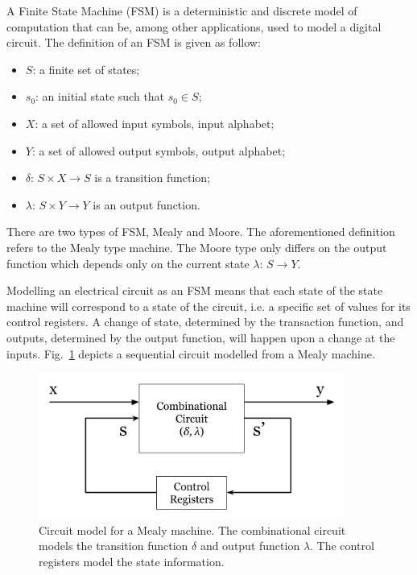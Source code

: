 A Finite State Machine (FSM) is a deterministic and discrete model of computation that can be, among other applications, used to model a digital circuit. The definition of an FSM is given as follow:

\begin{itemize}
    \item[] $S$: a finite set of states;
    \item[] $s_{0}$: an initial state such that  $s_0 \in S$;
    \item[] $X$: a set of allowed input symbols, input alphabet;
    \item[] $Y$: a set of allowed output symbols, output alphabet;
    \item[] $\delta$: $S \times X \to S$ is a transition function;
    \item[] $\lambda$: $S \times Y \to Y$ is an output function.
\end{itemize}

There are two types of FSM, Mealy and Moore. The aforementioned definition refers to the Mealy type machine. The Moore type only differs on the output function which depends only on the current state $\lambda$: $S \to Y$.

Modelling an electrical circuit as an FSM means that each state of the state machine will correspond to a state of the circuit, i.e. a specific set of values for its control registers. A change of state, determined by the transaction function, and outputs, determined by the output function, will happen upon a change at the inputs. Fig.~\ref{fig:mealy_circuit} depicts a sequential circuit modelled from a Mealy machine.

\begin{figure}[htb!]
	\centering
	\includegraphics[width=10cm]{images/mealy_circuit.png}
	\caption{Circuit model for a Mealy machine. The combinational circuit models the transition function $\delta$ and output function $\lambda$. The control registers model the state information.}
	\label{fig:mealy_circuit}
\end{figure}

